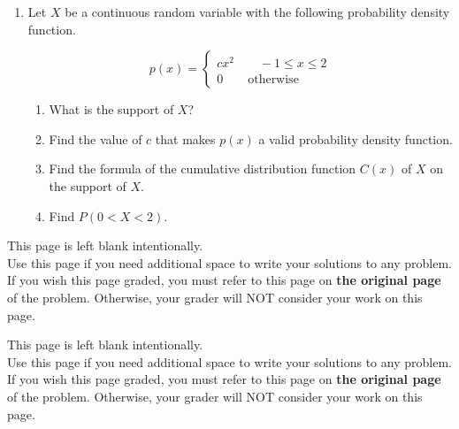 \documentclass[11pt]{article}
\begin{document}
\begin{enumerate}
\newpage


\item Let $X$ be a continuous random variable with the following probability density function.

\[p(x)=\begin{cases}cx^2\qquad -1\le x\le 2\\ 0 \qquad \text{otherwise}\end{cases}\]

\begin{enumerate}
    \item What is the support of $X$?

    \vfill

    \item Find the value of $c$ that makes $p(x)$ a valid probability density function.

    \vfill
    
    \item Find the formula of the cumulative distribution function $C(x)$ of $X$ on the support of $X$.

    \vfill

    \item Find $P(0<X<2)$.

    \vfill
\end{enumerate}


\end{enumerate}

\newpage

This page is left blank intentionally.\\

Use this page if you need additional space to write your solutions to any problem. \\

If you wish this page graded, you must refer to this page on \textbf{the original page} of the problem. Otherwise, your grader will NOT consider your work on this page.

\newpage

This page is left blank intentionally.\\

Use this page if you need additional space to write your solutions to any problem. \\

If you wish this page graded, you must refer to this page on \textbf{the original page} of the problem. Otherwise, your grader will NOT consider your work on this page.
\end{document}
